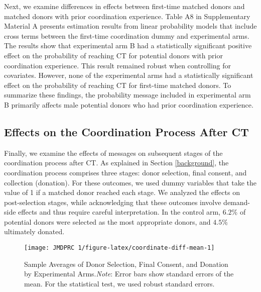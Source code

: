 \documentclass[12pt, a4paper]{article}
\begin{document}
Next, we examine differences in effects between first-time matched donors and matched donors with prior coordination experience. Table A8 in Supplementary Material A presents estimation results from linear probability models that include cross terms between the first-time coordination dummy and experimental arms. The results show that experimental arm B had a statistically significant positive effect on the probability of reaching CT for potential donors with prior coordination experience. This result remained robust when controlling for covariates. However, none of the experimental arms had a statistically significant effect on the probability of reaching CT for first-time matched donors. To summarize these findings, the probability message included in experimental arm B primarily affects male potential donors who had prior coordination experience.

\hypertarget{process}{%
\subsection{Effects on the Coordination Process After CT}\label{process}}

Finally, we examine the effects of messages on subsequent stages of the coordination process after CT. As explained in Section \ref{background}, the coordination process comprises three stages: donor selection, final consent, and collection (donation). For these outcomes, we used dummy variables that take the value of 1 if a matched donor reached each stage. We analyzed the effects on post-selection stages, while acknowledging that these outcomes involve demand-side effects and thus require careful interpretation. In the control arm, \(6.2\)\% of potential donors were selected as the most appropriate donors, and \(4.5\)\% ultimately donated.

\begin{figure}[t]
\texttt{[image: JMDPRC~1/figure-latex/coordinate-diff-mean-1]} \caption{Sample Averages of Donor Selection, Final Consent, and Donation by Experimental Arms.\newline \emph{Note}: Error bars show standard errors of the mean. For the statistical test, we used robust standard errors.}\label{fig:coordinate-diff-mean}
\end{figure}
\end{document}
